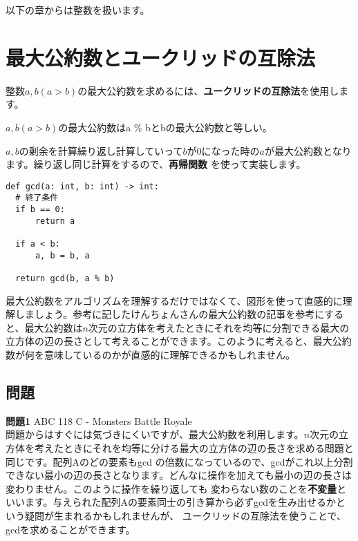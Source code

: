 以下の章からは整数を扱います。

\section{最大公約数とユークリッドの互除法}

整数$a, b(a > b)$の最大公約数を求めるには、\textbf{ユークリッドの互除法}を使用します。

\begin{tcolorbox}[enhanced,title=ユークリッドの互除法, 
  attach boxed title to top left, 
  colback=white!95!blue,
  colbacktitle=white!10!blue!50!black,
  drop fuzzy shadow,
  boxrule=0.25mm,
  ]
  $a, b(a > b)$の最大公約数はa \% bとbの最大公約数と等しい。
\end{tcolorbox}

$a, b$の剰余を計算繰り返し計算していって$b$が0になった時の$a$が最大公約数となります。繰り返し同じ計算をするので、\textbf{再帰関数}
を使って実装します。

\begin{lstlisting}[caption=ユークリッドの互助法実装, frame=TRBL, label={euclid}]
def gcd(a: int, b: int) -> int:
  # 終了条件
  if b == 0:
      return a
  
  if a < b:
      a, b = b, a
      
  return gcd(b, a % b)
\end{lstlisting}

最大公約数をアルゴリズムを理解するだけではなくて、図形を使って直感的に理解しましょう。参考に記したけんちょんさんの最大公約数の記事を参考にすると、最大公約数は$n$次元の立方体を考えたときにそれを均等に分割できる最大の立方体の辺の長さとして考えることができます。このように考えると、最大公約数が何を意味しているのかが直感的に理解できるかもしれません。

\subsection{問題}
\textbf{問題1} ABC 118 C - Monsters Battle Royale \\
問題からはすぐには気づきにくいですが、最大公約数を利用します。$n$次元の立方体を考えたときにそれを均等に分ける最大の立方体の辺の長さを求める問題と同じです。配列Aのどの要素もgcd
の倍数になっているので、gcdがこれ以上分割できない最小の辺の長さとなります。どんなに操作を加えても最小の辺の長さは変わりません。このように操作を繰り返しても
変わらない数のことを\textbf{不変量}といいます。与えられた配列Aの要素同士の引き算から必ずgcdを生み出せるかという疑問が生まれるかもしれませんが、
ユークリッドの互除法を使うことで、gcdを求めることができます。

